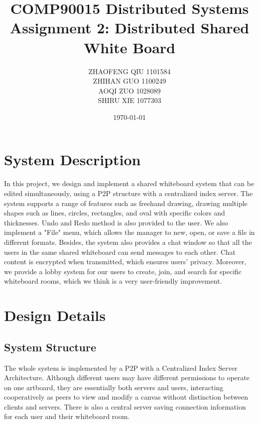 \documentclass[a4paper]{article}
\title{COMP90015 Distributed Systems \\Assignment 2: Distributed Shared White Board}
\author{ZHAOFENG QIU 1101584\\ ZHIHAN GUO 1100249\\ AOQI ZUO 1028089\\ SHIRU XIE 1077303}
\date{\today}
\begin{document}
\maketitle

\section{System Description}
\label{sec:description}

In this project, we design and implement a shared whiteboard system that can be edited simultaneously, using a P2P structure with a centralized index server. The system supports a range of features such as freehand drawing, drawing multiple shapes such as lines, circles, rectangles, and oval with specific colors and thicknesses. Undo and Redo method is also provided to the user. We also implement a "File" menu, which allows the manager to new, open, or save a file in different formats. Besides, the system also provides a chat window so that all the users in the same shared whiteboard can send messages to each other.  Chat content is encrypted when transmitted, which ensures users' privacy. Moreover, we provide a lobby system for our users to create, join, and search for specific whiteboard rooms, which we think is a very user-friendly improvement.

\section{Design Details}
\subsection{System Structure}
\label{sec:structure}
The whole system is implemented by a P2P with a Centralized Index Server Architecture. Although different users may have different permissions to operate on one artboard, they are essentially both servers and users, interacting cooperatively as peers to view and modify a canvas without distinction between clients and servers. There is also a central server saving connection information for each user and their whiteboard room. 
\end{document}
